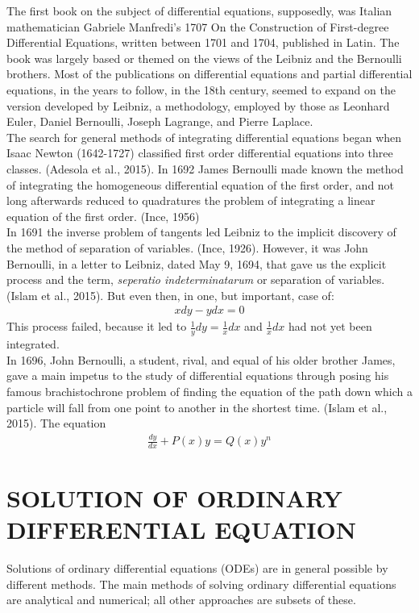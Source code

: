 \documentclass[11pt]{report}
\newcommand{\dsp}{\displaystyle}
\newcommand{\NI}{\noindent}
\begin{document}
	\NI The first book on the subject of differential equations, supposedly, was Italian mathematician Gabriele Manfredi’s 1707 On the Construction of First-degree Differential Equations, written between 1701 and 1704, published in Latin.  The book was largely based or themed on the views of the Leibniz and the Bernoulli brothers. Most of the publications on differential equations and partial differential equations, in the years to follow, in the 18th century, seemed to expand on the version developed by Leibniz, a methodology, employed by those as Leonhard Euler, Daniel Bernoulli, Joseph Lagrange, and Pierre Laplace.\\
	
	\NI The search for general methods of integrating differential equations began when Isaac Newton (1642-1727) classified first order differential equations into three classes. (Adesola et al., 2015). In 1692 James Bernoulli made known the method of integrating the homogeneous differential 
	equation of the first order, and not long afterwards reduced to quadratures the problem of integrating a linear equation of the first order. (Ince, 1956)\\

	\NI In 1691 the inverse problem of tangents led Leibniz to the implicit discovery of the method of separation of variables. (Ince, 1926). However, it was John Bernoulli, in a letter to Leibniz, dated May 9, 1694, that gave us the explicit process and the term, \emph{seperatio indeterminatarum} or separation of variables. (Islam et al., 2015). But even then, in one, but important, case of: 
	\begin{eqnarray*}
		x dy - y dx = 0
	\end{eqnarray*}
	This process failed, because it led to $\dsp \frac{1}{y}dy = \frac{1}{x}dx$ and $\dsp \frac{1}{x}dx$ had not yet been integrated.\\
	
	\NI In 1696, John Bernoulli, a student, rival, and equal of his older brother James, gave a main impetus to the study of differential equations through posing his famous brachistochrone problem of finding the equation of the path down which a particle will fall from one point to another in the shortest time. (Islam et al., 2015). The equation
	\begin{eqnarray*}
		\frac{dy}{dx} + P(x)y = Q(x)y^n
	\end{eqnarray*} 
	
	\section{SOLUTION OF ORDINARY DIFFERENTIAL EQUATION}
	Solutions of ordinary differential equations (ODEs) are in general possible by different methods. The main methods of solving ordinary differential equations are analytical and numerical; all other approaches are subsets of these.\\
	
\end{document}
